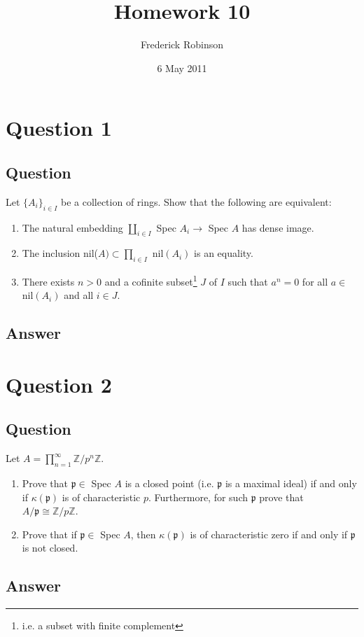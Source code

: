 \documentclass[11pt]{article}
\begin{document}



\title{Homework 10}
\author{Frederick Robinson}
\date{6 May 2011}
\maketitle




\section{Question 1}
\subsection{Question}
Let $\{A_i\}_{i \in I}$ be a collection of rings. Show that the following are equivalent:
\begin{enumerate}
\item The natural embedding $\coprod_{i \in I}$ Spec $A_i \to $ Spec $A$ has dense image.
\item The inclusion nil($A ) \subset \prod_{i \in I}$ nil$(A_i)$ is an equality.
\item There exists $n >0$ and a cofinite subset\footnote{i.e. a subset with finite complement} $J$ of $I$ such that $a^n =0$ for all $a \in $ nil$(A_i)$ and all $i \in J$.
\end{enumerate}
\subsection{Answer}

\section{Question 2}
\subsection{Question}
Let $A = \prod_{n=1}^\infty \mathbb{Z}/p^n \mathbb{Z}$.
\begin{enumerate}
\item Prove that $\mathfrak{p} \in $ Spec $A$ is a closed point (i.e. $\mathfrak{p}$ is a maximal ideal) if and only if $\kappa(\mathfrak{p}) $ is of characteristic $p$. Furthermore, for such $\mathfrak{p}$ prove that $A/\mathfrak{p} \cong \mathbb{Z}/ p \mathbb{Z}$.
\item Prove that if $\mathfrak{p} \in $ Spec $A$, then $\kappa( \mathfrak{p})$ is of characteristic zero if and only if $\mathfrak{p}$ is not closed.
\end{enumerate}
\subsection{Answer}
\end{document}
